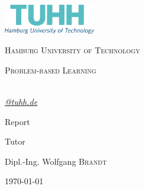 \begin{titlepage}
	\centering
	\includegraphics[width=0.30\textwidth]{pictures/office_rgb_en.png}\par\vspace{1cm}
	{\scshape\LARGE Hamburg University of Technology \par}
	\vspace{1cm}
	{\scshape\Large Problem-based Learning\par}
	\vspace{1.5cm}
	{\huge\bfseries \thetitle\par}
	\vspace{2cm}
	{\Large\itshape \theauthor\\\href{mailto:@tuhh.de}{@tuhh.de}\par}
	
	\vfill	%
	Report\par	%
	
	\vfill	%
	Tutor\par
	Dipl.-Ing. Wolfgang \textsc{Brandt}

	\vfill

	{\large \today\par}
\end{titlepage}


